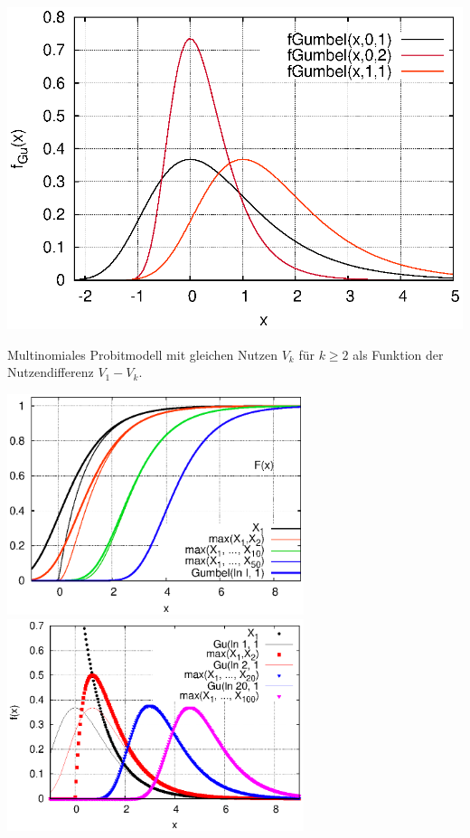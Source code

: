 \documentclass[a4paper]{foils}
\begin{document}
\begin{landscape}
\begin{center}
 \includegraphics[width=1.0\textwidth]{./figsDiscr/gumbel_f.eps}   
\vspace{1em}



\newpage
\vspace{1em}
\parbox{1.1\textwidth}{Multinomiales Probitmodell mit
gleichen Nutzen $V_k$ f\"ur $k\ge 2$ als Funktion der Nutzendifferenz
$V_1-V_k$.}

\newpage
\vspace{1em}

 \includegraphics[width=0.65\textwidth]{./figsDiscr/gumbelGrenz_F.eps}   
 \includegraphics[width=0.65\textwidth]{./figsDiscr/gumbelGrenz_f.eps}   
\vspace{1em}


\end{center}
\end{landscape}
\end{document}
